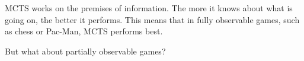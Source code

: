MCTS works on the premises of information. The more it knows about what is going on, the better it performs. This means that in fully observable games, such as chess or Pac-Man, MCTS performs best.

But what about partially observable games?





